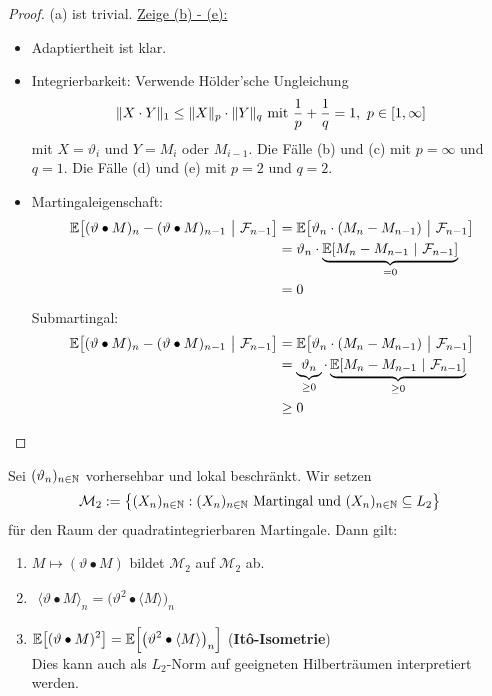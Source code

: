 \begin{proof}
(a) ist trivial.\nl
\underline{Zeige (b) - (e):}
\begin{itemize}
\item Adaptiertheit ist klar.
\item Integrierbarkeit: Verwende Hölder'sche Ungleichung
\begin{align*}
\Vert X\cdot Y\Vert_1\leq\Vert X\Vert_p\cdot\Vert Y\Vert_q\mit\frac{1}{p}+\frac{1}{q}=1,~p\in[1,\infty]
\end{align*}
mit $X=\vartheta_i$ und $Y=M_i$ oder $M_{i-1}$. Die Fälle (b) und (c) mit $p=\infty$ und $q=1$. Die Fälle (d) und (e) mit $p=2$ und $q=2$.
\item Martingaleigenschaft:
\begin{align*}
\E\big[(\vartheta\bullet M)_n-(\vartheta\bullet M)_{n-1}~\big|~\F_{n-1}\big]
&=\E\big[\vartheta_n\cdot(M_n-M_{n-1})~\big|~\F_{n-1}\big]\\
&=\vartheta_n\cdot\underbrace{\E[M_n-M_{n-1}~|~\F_{n-1}]}_{=0}\\
&=0
\end{align*}
Submartingal:
\begin{align*}
\E\big[(\vartheta\bullet M)_n-(\vartheta\bullet M)_{n-1}~\big|~\F_{n-1}\big]
&=\E\big[\vartheta_n\cdot(M_n-M_{n-1})~\big|~\F_{n-1}\big]\\
&=\underbrace{\vartheta_n}_{\geq0}\cdot\underbrace{\E[M_n-M_{n-1}~|~\F_{n-1}]}_{\geq0}\\
&\geq0
\end{align*}
\end{itemize}
\end{proof}

\begin{proposition}\label{prop2.6}
Sei $(\vartheta_n)_{n\in\N}$ vorhersehbar und lokal beschränkt. Wir setzen
\begin{align*}
	\mathcal{M}_2:=\big\lbrace (X_n)_{n\in\N}:(X_n)_{n\in\N}\text{ Martingal und }(X_n)_{n\in\N}\subseteq L_2\big\rbrace
\end{align*}
für den Raum der quadratintegrierbaren Martingale. Dann gilt:
\begin{enumerate}[label=(\alph*)]
	\item $M\mapsto(\vartheta\bullet M)$ bildet $\mathcal{M}_2$ auf $\mathcal{M}_2$ ab.
\item $\begin{aligned}
\langle\vartheta\bullet M\rangle_n=\big(\vartheta^2\bullet\langle M\rangle\big)_n
\end{aligned}$
\item $\begin{aligned}
\E\big[(\vartheta\bullet M)^2\big]=\E\Big[\big(\vartheta^2\bullet\langle M\rangle\big)_n\Big]
\end{aligned}$ (\textbf{It\^o-Isometrie})\\
Dies kann auch als $L_2$-Norm auf geeigneten Hilberträumen interpretiert werden.
\end{enumerate}
\end{proposition}


